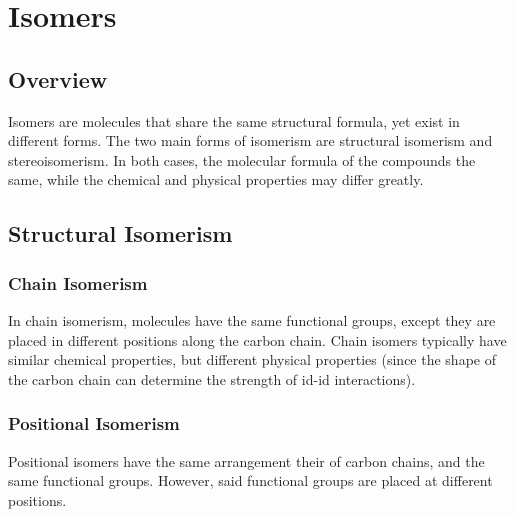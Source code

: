 

\pagebreak
\section{Isomers}

\subsection{Overview}

Isomers are molecules that share the same structural formula, yet exist in different forms. The two main
forms of isomerism are structural isomerism and stereoisomerism. In both cases, the molecular formula of the
compounds the same, while the chemical and physical properties may differ greatly.


\subsection{Structural Isomerism}

	\subsubsection{Chain Isomerism}

		In chain isomerism, molecules have the same functional groups, except they are placed in different positions
		along the carbon chain. Chain isomers typically have similar chemical properties, but different physical
		properties (since the shape of the carbon chain can determine the strength of id-id interactions).





	\subsubsection{Positional Isomerism}
		Positional isomers have the same arrangement their of carbon chains, and the same functional groups. However, said
		functional groups are placed at different positions.



